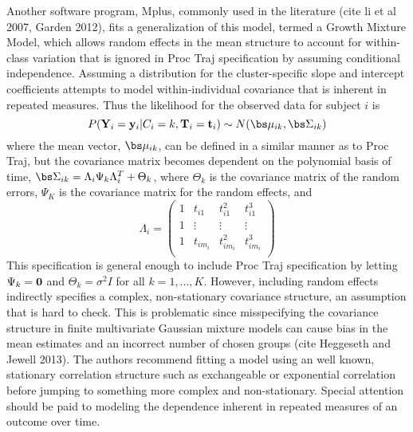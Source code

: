 Another software program, Mplus, commonly used in the literature (cite li et  al 2007, Garden 2012), fits a generalization of this model, termed a Growth Mixture Model, which allows random effects in the mean structure to account for within-class variation that is ignored in Proc Traj specification by assuming conditional independence. Assuming a distribution for the cluster-specific slope and intercept coefficients attempts to model within-individual covariance that is inherent in repeated measures. Thus the likelihood for the observed data for subject $i$ is
$$P(\B Y_{i} = \B y_{i}|C_{i}=k,\B T_{i}=\B t_{i})\sim N(\bs\mu_{ik},\bs\Sigma_{ik})$$
where the mean vector, $\bs\mu_{ik}$, can be defined in a similar manner as to Proc Traj, but the covariance matrix becomes dependent on the polynomial basis of time, $\bs\Sigma_{ik}=\Lambda_{i}\Psi_{k}\Lambda_{i}^{T}+\Theta_{k}$, where $\Theta_{k}$ is the covariance matrix of the random errors, $\Psi_{K}$ is the covariance matrix for the random effects, and $$\Lambda_{i}=\left(\begin{array}{cccc}1&t_{i1}&t_{i1}^{2}&t_{i1}^{3}\\ 1&\vdots&\vdots&\vdots\\ 1&t_{im_{i}}&t_{im_{i}}^{2}&t_{im_{i}}^{3}\\  \end{array} \right)$$
This specification is general enough to include Proc Traj specification by letting $\Psi_{k}=\mathbf 0$ and $\Theta_{k}=\sigma^{2}I$ for all $k=1,...,K$. However, including random effects indirectly specifies a complex, non-stationary covariance structure, an assumption that is hard to check. This is problematic since misspecifying the covariance structure in finite multivariate Gaussian mixture models can cause bias in the mean estimates and an incorrect number of chosen groups (cite Heggeseth and Jewell 2013). The authors recommend fitting a model using an well known, stationary correlation structure such as exchangeable or exponential correlation before jumping to something more complex and non-stationary. Special attention should be paid to modeling the dependence inherent in repeated measures of an outcome over time.\\


